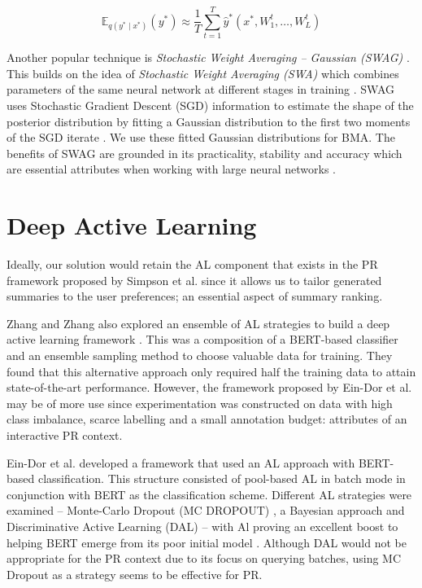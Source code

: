 \documentclass[ %
                    author={James Stephenson},
                supervisor={Dr. Edwin Simpson},
                    degree={MSc},
                     title={PROJECT PLAN},
                  subtitle={ Bayesian Deep Learning For Extractive Test Summarisation},
                      type={},
                      year={2022}]{../additions/dissertation}
\begin{document}
			$$
				\mathbb{E}_{q(y^\ast \mid x^\ast)}(y^\ast) \approx \frac{1}{T} \sum_{t=1}^{T} \hat{y}^\ast(x^\ast, W_{1}^{t}, \ldots, W_{L}^{t})
			$$
			
			Another popular technique is \emph{Stochastic Weight Averaging – Gaussian (SWAG)} \cite{Maddox19}. This builds on the idea of \emph{Stochastic Weight Averaging (SWA)} which combines parameters of the same neural network at different stages in training \cite{Dmitrii18}. SWAG uses Stochastic Gradient Descent (SGD) information to estimate the shape of the posterior distribution by fitting a Gaussian distribution to the first two moments of the SGD iterate \cite{Maddox19}. We use these fitted Gaussian distributions for BMA. The benefits of SWAG are grounded in its practicality, stability and accuracy which are essential attributes when working with large neural networks \cite{Maddox19}.

			
		\section{Deep Active Learning}
		\label{chap:literaturereview:deepactive}
		
		Ideally, our solution would retain the AL component that exists in the PR framework proposed by Simpson et al. \cite{Simpson19} since it allows us to tailor generated summaries to the user preferences; an essential aspect of summary ranking.
		
		\medbreak
		Zhang and Zhang also explored an ensemble of AL strategies to build a deep active learning framework \cite{Zhang19}. This was a composition of a BERT-based classifier and an ensemble sampling method to choose valuable data for training. They found that this alternative approach only required half the training data to attain state-of-the-art performance. However, the framework proposed by Ein-Dor et al. \cite{EinDor20} may be of more use since experimentation was constructed on data with high class imbalance, scarce labelling and a small annotation budget: attributes of an interactive PR context.  
		
		\medbreak
		Ein-Dor et al. \cite{EinDor20} developed a framework that used an AL approach with BERT-based classification. This structure consisted of pool-based AL in batch mode in conjunction with BERT as the classification scheme. Different AL strategies were examined – Monte-Carlo Dropout (MC DROPOUT) \cite{Gal15}, a Bayesian approach and Discriminative Active Learning (DAL) \cite{Gissin19} – with Al proving an excellent boost to helping BERT emerge from its poor initial model \cite{EinDor20}. Although DAL would not be appropriate for the PR context due to its focus on querying batches, using MC Dropout as a strategy seems to be effective for PR.
		
\end{document}
